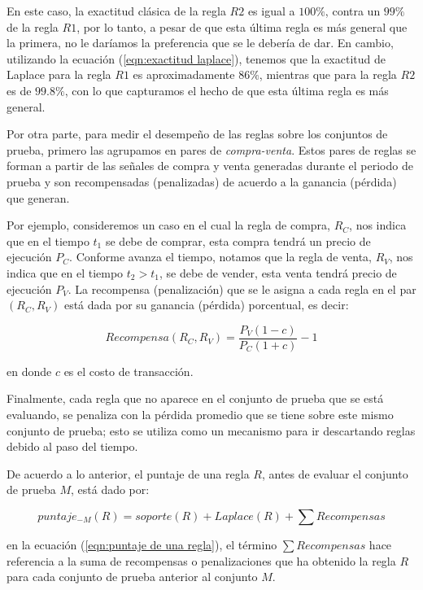\documentclass[12pt]{report}
\theoremstyle{break}
\theoremstyle{break}
\begin{document}
En este caso, la exactitud clásica de la regla $R2$ es igual a $100\%$, contra un $99\%$ de la regla $R1$, por lo tanto, a pesar de que esta última regla es más general que la primera, no le daríamos la preferencia que se le debería de dar. En cambio, utilizando la ecuación (\ref{eqn:exactitud laplace}), tenemos que la exactitud de Laplace para la regla $R1$  es aproximadamente $86\%$, mientras que para la regla $R2$ es de $99.8 \%$, con lo que capturamos el hecho de que esta última regla es más general.

Por otra parte, para medir el desempeño de las reglas sobre los conjuntos de prueba, primero las agrupamos en pares de \textit{compra-venta}. Estos pares de reglas se forman a partir de las señales de compra y venta generadas durante el periodo de prueba y son recompensadas (penalizadas) de acuerdo a la ganancia (pérdida) que generan.

Por ejemplo, consideremos un caso en el cual la regla de compra, $R_{C}$, nos indica que en el tiempo $t_1$ se debe de comprar, esta compra tendrá un precio de ejecución $P_{C}$. Conforme avanza el tiempo, notamos que la regla de venta, $R_{V}$, nos indica que en el tiempo $t_2 > t_1$, se debe de vender, esta venta tendrá precio de ejecución $P_{V}$. La recompensa (penalización) que se le asigna a cada regla en el par $\left(R_C, R_V\right)$ está dada por su ganancia (pérdida) porcentual, es decir:

\begin{equation}\label{eqn:recompensa reglas}
Recompensa(R_C, R_V) = \dfrac{P_V (1 - c)}{P_C (1 + c) } - 1
\end{equation}

en donde $c$ es el costo de transacción.

Finalmente, cada regla que no aparece en el conjunto de prueba que se está evaluando, se penaliza con la pérdida promedio que se tiene sobre este mismo conjunto de prueba; esto se utiliza como un mecanismo para ir descartando reglas debido al paso del tiempo.

De acuerdo a lo anterior, el puntaje de una regla $R$, antes de evaluar el conjunto de prueba $M$, está dado por:

\begin{equation} \label{eqn:puntaje de una regla}
puntaje_{-M}(R) = soporte(R) + Laplace(R) + \sum Recompensas
\end{equation}

en la ecuación (\ref{eqn:puntaje de una regla}), el término $ \sum Recompensas$ hace referencia a la suma de recompensas o penalizaciones que ha obtenido la regla $R$ para cada conjunto de prueba anterior al conjunto $M$.
\end{document}
